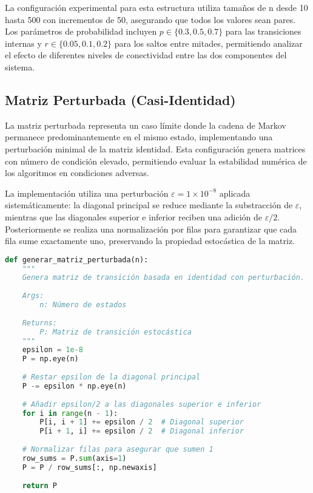 La configuración experimental para esta estructura utiliza tamaños de n desde 10 hasta 500 con incrementos de 50, asegurando que todos los valores sean pares. Los parámetros de probabilidad incluyen $p \in \{0.3, 0.5, 0.7\}$ para las transiciones internas y $r \in \{0.05, 0.1, 0.2\}$ para los saltos entre mitades, permitiendo analizar el efecto de diferentes niveles de conectividad entre las dos componentes del sistema.

\subsection{Matriz Perturbada (Casi-Identidad)}

La matriz perturbada representa un caso límite donde la cadena de Markov permanece predominantemente en el mismo estado, implementando una perturbación minimal de la matriz identidad. Esta configuración genera matrices con número de condición elevado, permitiendo evaluar la estabilidad numérica de los algoritmos en condiciones adversas.

La implementación utiliza una perturbación $\varepsilon = 1 \times 10^{-8}$ aplicada sistemáticamente: la diagonal principal se reduce mediante la substracción de $\varepsilon$, mientras que las diagonales superior e inferior reciben una adición de $\varepsilon/2$. Posteriormente se realiza una normalización por filas para garantizar que cada fila sume exactamente uno, preservando la propiedad estocástica de la matriz.

\begin{lstlisting}[language=Python]
def generar_matriz_perturbada(n):
    """
    Genera matriz de transición basada en identidad con perturbación.
    
    Args:
        n: Número de estados
    
    Returns:
        P: Matriz de transición estocástica
    """
    epsilon = 1e-8
    P = np.eye(n)
    
    # Restar epsilon de la diagonal principal
    P -= epsilon * np.eye(n)
    
    # Añadir epsilon/2 a las diagonales superior e inferior
    for i in range(n - 1):
        P[i, i + 1] += epsilon / 2  # Diagonal superior
        P[i + 1, i] += epsilon / 2  # Diagonal inferior
    
    # Normalizar filas para asegurar que sumen 1
    row_sums = P.sum(axis=1)
    P = P / row_sums[:, np.newaxis]
    
    return P
\end{lstlisting}

